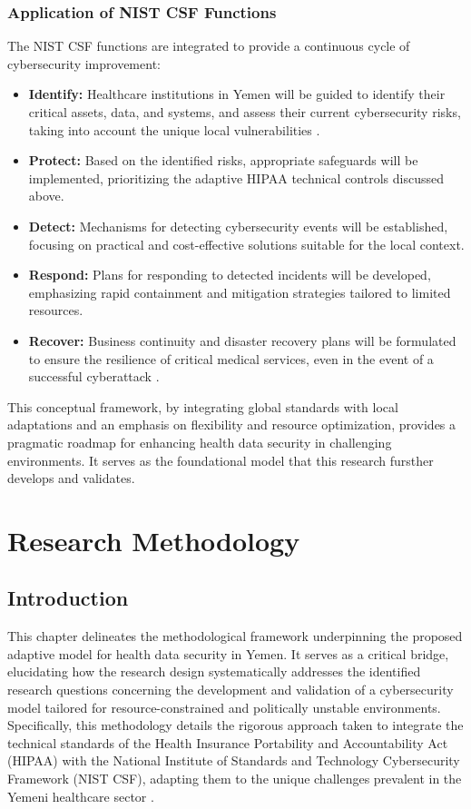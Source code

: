 \documentclass[12pt, a4paper, oneside]{report}
\begin{document}
	\subsection{Application of NIST CSF Functions}
	The NIST CSF functions are integrated to provide a continuous cycle of cybersecurity improvement:
	\begin{itemize}
		\item \textbf{Identify:} Healthcare institutions in Yemen will be guided to identify their critical assets, data, and systems, and assess their current cybersecurity risks, taking into account the unique local vulnerabilities \cite{rahmany2026aida}.
		\item \textbf{Protect:} Based on the identified risks, appropriate safeguards will be implemented, prioritizing the adaptive HIPAA technical controls discussed above.
		\item \textbf{Detect:} Mechanisms for detecting cybersecurity events will be established, focusing on practical and cost-effective solutions suitable for the local context.
		\item \textbf{Respond:} Plans for responding to detected incidents will be developed, emphasizing rapid containment and mitigation strategies tailored to limited resources.
		\item \textbf{Recover:} Business continuity and disaster recovery plans will be formulated to ensure the resilience of critical medical services, even in the event of a successful cyberattack \cite{melaku2023context} \cite{nist2024sp80066r2}.
		
	\end{itemize}
	This conceptual framework, by integrating global standards with local adaptations and an emphasis on flexibility and resource optimization, provides a pragmatic roadmap for enhancing health data security in challenging environments. It serves as the foundational model that this research fursther develops and validates.
	
	
	\chapter{Research Methodology}
	\section{Introduction}
	This chapter delineates the methodological framework underpinning the proposed adaptive model for health data security in Yemen. It serves as a critical bridge, elucidating how the research design systematically addresses the identified research questions concerning the development and validation of a cybersecurity model tailored for resource-constrained and politically unstable environments. Specifically, this methodology details the rigorous approach taken to integrate the technical standards of the Health Insurance Portability and Accountability Act (HIPAA) with the National Institute of Standards and Technology Cybersecurity Framework (NIST CSF), adapting them to the unique challenges prevalent in the Yemeni healthcare sector \cite{alhammadi2024advancing} \cite{al2025political} \cite{hhs2024hipaa}
	\cite{rahmany2026aida}.
	
\end{document}
